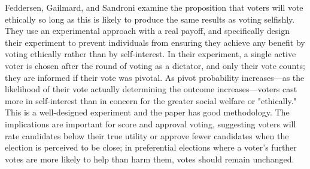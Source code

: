 Feddersen, Gailmard, and Sandroni examine the proposition that voters will vote ethically so long as this is likely to produce the same results as voting selfishly.  They use an experimental approach with a real payoff, and specifically design their experiment to prevent individuals from ensuring they achieve any benefit by voting ethically rather than by self-interest.  In their experiment, a single active voter is chosen after the round of voting as a dictator, and only their vote counts; they are informed if their vote was pivotal.  As pivot probability increases—as the likelihood of their vote actually determining the outcome increases—voters cast more in self-interest than in concern for the greater social welfare or "ethically."  This is a well-designed experiment and the paper has good methodology.  The implications are important for score and approval voting, suggesting voters will rate candidates below their true utility or approve fewer candidates when the election is perceived to be close; in preferential elections where a voter's further votes are more likely to help than harm them, votes should remain unchanged.
